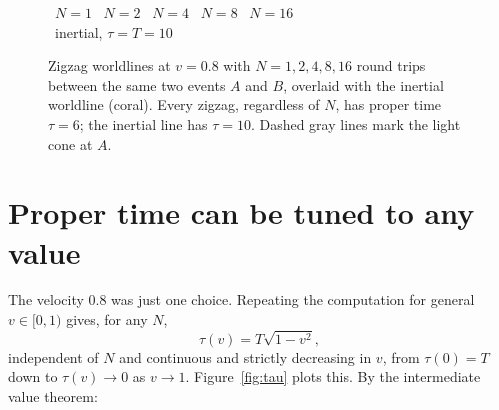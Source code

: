 \documentclass[11pt]{article}
\newcommand{\zigzag}[2]{%
  \pgfmathsetmacro{\halfT}{5/#1}
  \pgfmathsetmacro{\amp}{0.8*\halfT}
  \pgfmathtruncatemacro{\nmax}{#1-1}
  \foreach \i in {0,...,\nmax} {
    \pgfmathsetmacro{\tzero}{\i*2*\halfT}
    \pgfmathsetmacro{\tmid}{\tzero+\halfT}
    \pgfmathsetmacro{\tend}{\tzero+2*\halfT}
    \draw[#2, line width=0.9pt] (0,\tzero) -- (\amp,\tmid) -- (0,\tend);
  }
}
\begin{document}
\begin{figure}[h]
\centering
{}

\vspace{1mm}
\begin{center}
\footnotesize
{}~$N=1$ \quad
{}~$N=2$ \quad
{}~$N=4$ \quad
{}~$N=8$ \quad
{}~$N=16$ \\[1mm]
~inertial, $\tau=T=10$
\end{center}

\caption{Zigzag worldlines at $v=0.8$ with $N=1,2,4,8,16$ round trips between
the same two events $A$ and $B$, overlaid with the inertial worldline
(coral). Every zigzag, regardless of $N$, has proper time $\tau=6$; the
inertial line has $\tau=10$. Dashed gray lines mark the light cone at $A$.}
\label{fig:mink}
\end{figure}

\section{Proper time can be tuned to any value}

The velocity $0.8$ was just one choice. Repeating the computation for
general $v\in[0,1)$ gives, for any $N$,
$$\tau(v) = T\sqrt{1-v^2},$$
independent of $N$ and continuous and strictly decreasing in $v$, from
$\tau(0)=T$ down to $\tau(v)\to 0$ as $v\to 1$. Figure~\ref{fig:tau} plots
this. By the intermediate value theorem:
\end{document}
